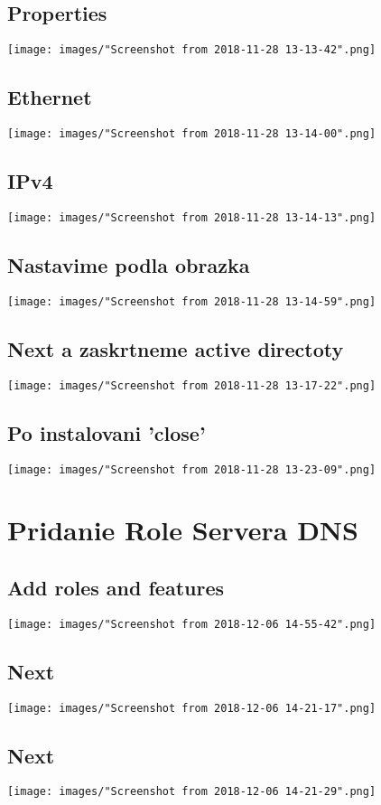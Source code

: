 \documentclass[slovak]{article}
\begin{document}
  \subsection{Properties}
  \texttt{[image: images/"Screenshot from 2018-11-28 13-13-42".png]}
  \subsection{Ethernet}
  \texttt{[image: images/"Screenshot from 2018-11-28 13-14-00".png]}
  \subsection{IPv4}
  \texttt{[image: images/"Screenshot from 2018-11-28 13-14-13".png]}
  \subsection{Nastavime podla obrazka}
  \texttt{[image: images/"Screenshot from 2018-11-28 13-14-59".png]}
  \subsection{Next a zaskrtneme active directoty}
  \texttt{[image: images/"Screenshot from 2018-11-28 13-17-22".png]}
  \subsection{Po instalovani 'close'}
  \texttt{[image: images/"Screenshot from 2018-11-28 13-23-09".png]}
  
  
  
  \newpage
  \section{Pridanie Role Servera DNS}
  \subsection{Add roles and features}
  \texttt{[image: images/"Screenshot from 2018-12-06 14-55-42".png]}
  \subsection{Next}
  \texttt{[image: images/"Screenshot from 2018-12-06 14-21-17".png]}
  \subsection{Next}
  \texttt{[image: images/"Screenshot from 2018-12-06 14-21-29".png]}
\end{document}
